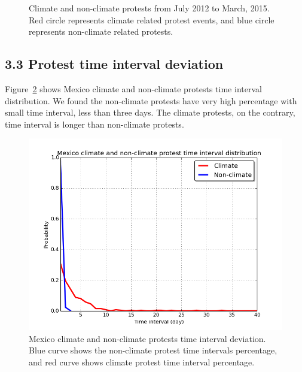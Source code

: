 \documentclass[9pt,twocolumn,twoside]{pnas-new}
\begin{document}
\begin{figure}[ht]
	\centering
	\caption{Climate and non-climate protests from July 2012 to March, 2015. Red circle represents climate related protest events, and blue circle represents non-climate related protests. }
\label{climate-map}
\end{figure}



\subsection{3.3 Protest time interval deviation}
Figure~\ref{Mexico-deviation} shows Mexico climate and non-climate protests time interval distribution. We found the non-climate protests have very high percentage with small time interval, less than three days. The climate protests, on the contrary, time interval is longer than non-climate protests.

\begin{figure}[ht]
\centerline
{\includegraphics[width=.3\textwidth]{figures/Mexico_deviation}}
\caption{Mexico climate and non-climate protests time interval deviation. Blue curve shows the non-climate protest time intervals percentage, and red curve shows climate protest time interval percentage.}
\label{Mexico-deviation}
\end{figure}
\end{document}
